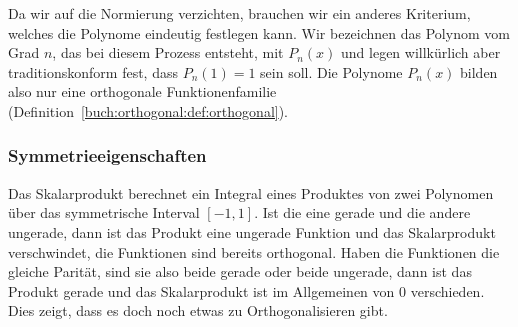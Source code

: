 Da wir auf die Normierung verzichten, brauchen wir ein anderes
Kriterium, welches die Polynome eindeutig festlegen kann.
Wir bezeichnen das Polynom vom Grad $n$, das bei diesem Prozess
entsteht, mit $P_n(x)$ und legen willkürlich aber traditionskonform
fest, dass $P_n(1)=1$ sein soll.
Die Polynome $P_n(x)$ bilden also nur eine orthogonale Funktionenfamilie
(Definition~\ref{buch:orthogonal:def:orthogonal}).

%
%
\subsubsection{Symmetrieeigenschaften}
%
Das Skalarprodukt berechnet ein Integral eines Produktes von zwei
Polynomen über das symmetrische Interval $[-1,1]$.
Ist die eine gerade und die andere ungerade, dann ist das
Produkt eine ungerade Funktion und das Skalarprodukt verschwindet,
die Funktionen sind bereits orthogonal.
Haben die Funktionen die gleiche Parität, 
sind sie also beide gerade oder beide ungerade, dann ist das Produkt
gerade und das Skalarprodukt ist im Allgemeinen von $0$ verschieden.
Dies zeigt, dass es doch noch etwas zu Orthogonalisieren gibt.

